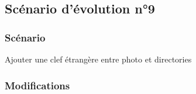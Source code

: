 \subsection{Scénario d'évolution n°9}
\subsubsection{Scénario}
Ajouter une clef étrangère entre photo et directories

\subsubsection{Modifications}